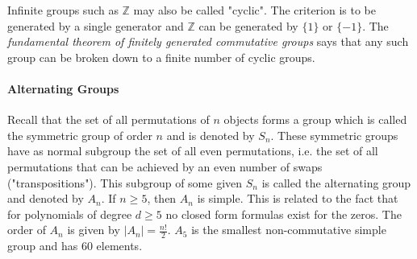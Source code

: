 %


\medskip
Infinite groups such as $\mathbb{Z}$ may also be called "cyclic". The criterion is to be generated by a single generator and $\mathbb{Z}$ can be generated by $\{1\}$ or $\{-1\}$. The \emph{fundamental theorem of finitely generated commutative groups} says that any such group can be broken down to a finite number of cyclic groups.










\paragraph{Alternating Groups}
Recall that the set of all permutations of $n$ objects forms a group which is called the symmetric group of order $n$ and is denoted by $S_n$. These symmetric groups have as normal subgroup the set of all even permutations, i.e. the set of all permutations that can be achieved by an even number of swaps ("transpositions"). This subgroup of some given $S_n$ is called the alternating group and denoted by $A_n$. If $n \geq 5$, then $A_n$ is simple. This is related to the fact that for polynomials of degree $d \geq 5$ no closed form formulas exist for the zeros. The order of $A_n$ is given by $|A_n| = \frac{n !}{2}$. $A_5$ is the smallest non-commutative simple group and has 60 elements.

